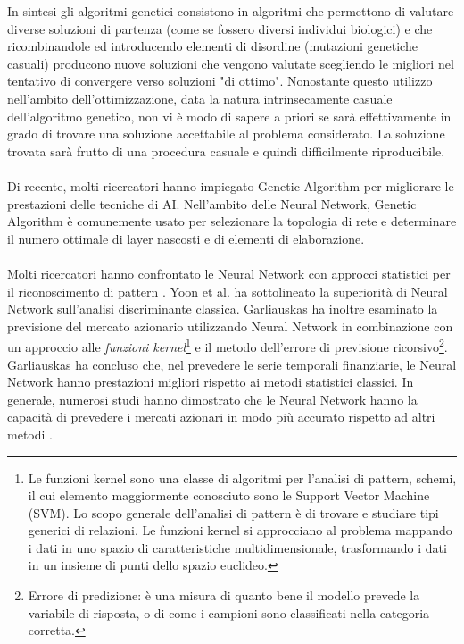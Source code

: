 \documentclass[a4paper,12pt]{report}
\begin{document}
In sintesi gli algoritmi genetici consistono in algoritmi che permettono di valutare diverse soluzioni di partenza (come se fossero diversi individui biologici) e che ricombinandole  ed introducendo elementi di disordine (mutazioni genetiche casuali) producono nuove soluzioni che vengono valutate scegliendo le migliori nel tentativo di convergere verso soluzioni "di ottimo". Nonostante questo utilizzo nell'ambito dell'ottimizzazione, data la natura intrinsecamente casuale dell'algoritmo genetico, non vi è modo di sapere a priori se sarà effettivamente in grado di trovare una soluzione accettabile al problema considerato. La soluzione trovata sarà frutto di una procedura casuale e quindi difficilmente riproducibile. 
\\~\\
Di recente, molti ricercatori hanno impiegato Genetic Algorithm per migliorare le prestazioni delle tecniche di AI. Nell'ambito delle Neural Network, Genetic Algorithm  è comunemente usato per selezionare la topologia di rete e determinare il numero ottimale di layer nascosti e di elementi di elaborazione.\\~\\
Molti ricercatori hanno confrontato le Neural Network con approcci statistici per il riconoscimento di pattern \cite{nng}\cite{nns}. Yoon et al. \cite{nny} ha sottolineato la superiorità di Neural Network sull'analisi discriminante classica. Garliauskas \cite{nng} ha inoltre esaminato la previsione del mercato azionario utilizzando Neural Network in combinazione con un approccio alle \textit{funzioni kernel}\footnote{Le funzioni kernel sono una classe di algoritmi per l'analisi di pattern, schemi, il cui elemento maggiormente conosciuto sono le Support Vector Machine (SVM). Lo scopo generale dell'analisi di pattern è di trovare e studiare tipi generici di relazioni. Le funzioni kernel si approcciano al problema mappando i dati in uno spazio di caratteristiche multidimensionale, trasformando i dati in un insieme di punti dello spazio euclideo.} e il metodo dell'errore di previsione ricorsivo\footnote{Errore di predizione: è una misura di quanto bene il modello prevede la variabile di risposta, o di come i campioni sono classificati nella categoria corretta.}.\\
Garliauskas \cite{nng} ha concluso che, nel prevedere le serie temporali finanziarie, le Neural Network hanno prestazioni migliori rispetto ai metodi statistici classici. In generale, numerosi studi hanno dimostrato che le Neural Network hanno la capacità di prevedere i mercati azionari in modo più accurato rispetto ad altri metodi \cite{nny}\cite{nnk}\cite{nnp}\cite{nns2}.
\end{document}
